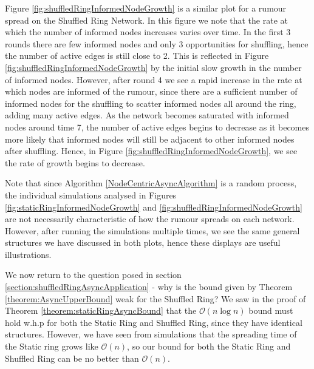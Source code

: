 Figure \ref{fig:shuffledRingInformedNodeGrowth} is a similar plot for a rumour spread on the Shuffled Ring Network. In this figure we note that the rate at which the number of informed nodes increases varies over time. In the first 3 rounds there are few informed nodes and only 3 opportunities for shuffling, hence the number of active edges is still close to 2. This is reflected in Figure \ref{fig:shuffledRingInformedNodeGrowth} by the initial slow growth in the number of informed nodes. However, after round 4 we see a rapid increase in the rate at which nodes are informed of the rumour, since there are a sufficient number of informed nodes for the shuffling to scatter informed nodes all around the ring, adding many active edges. 
As the network becomes saturated with informed nodes around time 7, the number of active edges begins to decrease as it becomes more likely that informed nodes will still be adjacent to other informed nodes after shuffling. Hence, in Figure \ref{fig:shuffledRingInformedNodeGrowth}, we see the rate of growth begins to decrease.


Note that since Algorithm \ref{NodeCentricAsyncAlgorithm} is a random process, the individual simulations analysed in Figures \ref{fig:staticRingInformedNodeGrowth} and \ref{fig:shuffledRingInformedNodeGrowth} are not necessarily characteristic of how the rumour spreads on each network. However, after running the simulations multiple times, we see the same general structures we have discussed in both plots, hence these displays are useful illustrations.

We now return to the question posed in section \ref{section:shuffledRingAsyncApplication} - why is the bound given by Theorem \ref{theorem:AsyncUpperBound} weak for the Shuffled Ring? We saw in the proof of Theorem \ref{theorem:staticRingAsyncBound} that the $\mathcal{O}(n \log n)$ bound must hold w.h.p for both the Static Ring and Shuffled Ring, since they have identical structures. However, we have seen from simulations that the spreading time of the Static ring grows like $\mathcal{O}(n)$, so our bound for both the Static Ring and Shuffled Ring can be no better than $\mathcal{O}(n)$. 


